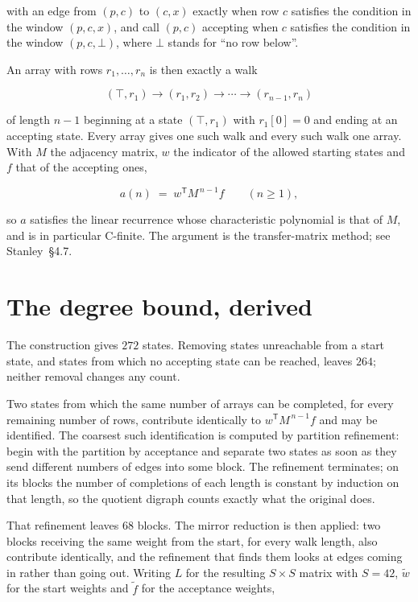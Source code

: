 \documentclass[11pt]{article}
\theoremstyle{definition}
\begin{document}
with an edge from $(p,c)$ to $(c,x)$ exactly when row $c$ satisfies the condition in the window $(p,c,x)$, and call $(p,c)$ accepting when $c$ satisfies the condition in the window $(p,c,\bot)$, where $\bot$ stands for ``no row below''.

An array with rows $r_1,\dots,r_n$ is then exactly a walk

\[(\top,r_1) \to (r_1,r_2) \to \cdots \to (r_{n-1},r_n)\]

of length $n-1$ beginning at a state $(\top,r_1)$ with $r_1[0]=0$ and ending at an accepting state. Every array gives one such walk and every such walk one array. With $M$ the adjacency matrix, $w$ the indicator of the allowed starting states and $f$ that of the accepting ones,

\[a(n) \;=\; w^{\mathsf T} M^{\,n-1} f \qquad (n \ge 1),\]

so $a$ satisfies the linear recurrence whose characteristic polynomial is that of $M$, and is in particular C-finite. The argument is the transfer-matrix method; see Stanley~\S4.7.

\section{The degree bound, derived}

The construction gives $272$ states. Removing states unreachable from a start state, and states from which no accepting state can be reached, leaves $264$; neither removal changes any count.

Two states from which the same number of arrays can be completed, for every remaining number of rows, contribute identically to $w^{\mathsf T}M^{\,n-1}f$ and may be identified. The coarsest such identification is computed by partition refinement: begin with the partition by acceptance and separate two states as soon as they send different numbers of edges into some block. The refinement terminates; on its blocks the number of completions of each length is constant by induction on that length, so the quotient digraph counts exactly what the original does.

That refinement leaves $68$ blocks. The mirror reduction is then applied: two blocks receiving the same weight from the start, for every walk length, also contribute identically, and the refinement that finds them looks at edges coming in rather than going out. Writing $L$ for the resulting $S \times S$ matrix with $S = 42$, $\tilde w$ for the start weights and $\tilde f$ for the acceptance weights,
\end{document}
